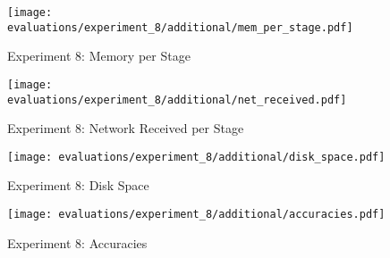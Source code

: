 \begin{figure}[p]
    \begin{adjustwidth}{-0.2\paperwidth}{-0.2\paperwidth}
        \centering
        \texttt{[image: evaluations/experiment\_8/additional/mem\_per\_stage.pdf]}
        \caption{Experiment 8: Memory per Stage}
        \label{fig:eval_8_memory_per_stage}
    \end{adjustwidth}
\end{figure}

\begin{figure}[p]
    \begin{adjustwidth}{-0.2\paperwidth}{-0.2\paperwidth}
        \centering
        \texttt{[image: evaluations/experiment\_8/additional/net\_received.pdf]}
        \caption{Experiment 8: Network Received per Stage}
        \label{fig:eval_8_memory_per_stage}
    \end{adjustwidth}

    \begin{adjustwidth}{-0.2\paperwidth}{-0.2\paperwidth}
        \centering
        \texttt{[image: evaluations/experiment\_8/additional/disk\_space.pdf]}
        \caption{Experiment 8: Disk Space}
        \label{fig:eval_8_disk_space}
    \end{adjustwidth}

    \begin{adjustwidth}{-0.2\paperwidth}{-0.2\paperwidth}
        \centering
        \texttt{[image: evaluations/experiment\_8/additional/accuracies.pdf]}
        \caption{Experiment 8: Accuracies}
        \label{fig:eval_8_accuracies}
    \end{adjustwidth}
\end{figure}